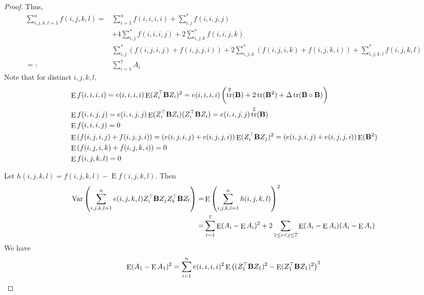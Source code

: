 \documentclass[11pt]{article}
\DeclareMathOperator{\mytr}{tr}
\DeclareMathOperator{\myE}{E}
\DeclareMathOperator{\myVar}{Var}
\theoremstyle{plain}
\theoremstyle{definition}
\theoremstyle{remark}
\begin{document}
\begin{proof}
Thus, 
\begin{equation*}
    \begin{split}
        \sum_{i,j,k,l=1}^n 
        f(i,j,k,l)
        =&
    \sum_{i=1}^n
    f(i,i,i,i)
    +\sum_{i,j}^*
    f(i,i,j,j)\\
    &+
    4\sum_{i,j}^*  f(i,i,i,j)
    +
    2\sum_{i,j,k}^* f(i,i,j,k)
    \\
    &
        \sum_{i,j}^* 
        (f(i,j,i,j)
            +
        f(i,j,j,i)
    )
    +2\sum_{i,j,k}^* (f(i,j,i,k) + f(i,j,k,i))
    +\sum_{i,j,k,l}^* f(i,j,k,l)
\\
=:&\sum_{i=1}^7 A_i
    \end{split}
\end{equation*}
Note that for distinct $i,j,k,l$,
\begin{align*}
    &\myE f(i,i,i,i)= e(i,i,i,i) \myE (Z_i^\top \BB Z_i)^2=
    e(i,i,i,i)\left(\mytr^2 (\BB) +2 \mytr(\BB^2) + \Delta \mytr (\BB\circ \BB)\right)
    \\
    &\myE f(i,i,j,j)= e(i,i,j,j) \myE (Z_i^\top \BB Z_i) (Z_i^\top \BB Z_i)=
    e(i,i,j,j) \mytr^2 (\BB)
    \\
    &\myE f(i,i,i,j)= 0
    \\
    &\myE \left(f(i,j,i,j)+ f(i,j,j,i)\right)= 
    \left(e(i,j,i,j)+e (i,j,j,i)\right) \myE (Z_i^\top \BB Z_j)^2
    =
    \left(e(i,j,i,j)+e (i,j,j,i)\right) \myE (\BB^2)
    \\
    &\myE \left(f(i,j,i,k)+ f(i,j,k,i)\right)= 
    0
    \\
    &\myE f(i,j,k,l)= 
    0
\end{align*}

Let $h(i,j,k,l)=f(i,j,k,l)-\myE f(i,j,k,l)$.
Then
\begin{equation*}
    \begin{split}
        \myVar \left(
            \sum_{i,j,k,l=1}^n e(i,j,k,l) Z_i^\top \BB Z_j Z_k^\top \BB Z_l
        \right)        
        =&
        \myE \left(
            \sum_{i,j,k,l=1}^n h(i,j,k,l) 
        \right)^2
        \\
        =&
        \sum_{i=1}^7 \myE (A_i-\myE A_i)^2
        +
        2\sum_{1\leq i<j\leq 7} \myE (A_i-\myE A_i)(A_i-\myE A_i)
    \end{split}
\end{equation*}
We have
\begin{equation*}
    \begin{split}
         \myE (A_1-\myE A_1)^2
         =\sum_{i=1}^n e(i,i,i,i)^2 \myE \left((Z_1^\top \BB Z_1)^2-\myE (Z_1^\top \BB Z_1)^2\right)^2
    \end{split}
\end{equation*}
    
\end{proof}
\end{document}
